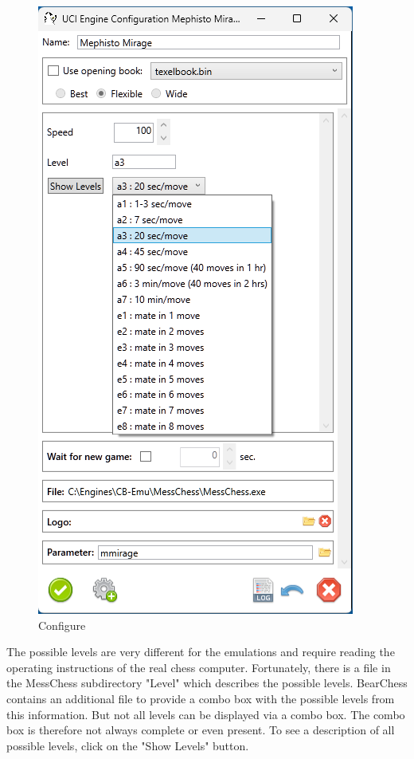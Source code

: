 \documentclass[11pt,a4paper]{article}
\begin{document}
\begin{figure}[H]
	\centering
	\includegraphics[scale=0.8]{MessChess3.png}
	\caption{Configure}
	\label{fig:MessChess3}
\end{figure}
The possible levels are very different for the emulations and require reading the operating instructions of the real chess computer. 
Fortunately, there is a file in the MessChess subdirectory "Level" which describes the possible levels. 
BearChess contains an additional file to provide a combo box with the possible levels from this information.
But not all levels can be displayed via a combo box. The combo box is therefore not always complete or even present. To see a description of all possible levels, click on the "Show Levels" button.\\
\end{document}
